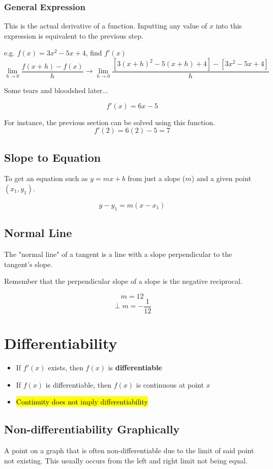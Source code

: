 \documentclass[a4paper,12pt]{article}
\begin{document}
\subsubsection{General Expression}
This is the actual derivative of a function. Inputting any value of $x$ into this expression is equivalent to the previous step.

e.g. $f(x) = 3x^2 - 5x + 4$, find $f'(x)$
$$\lim\limits_{h\to0}\frac{f(x+h)-f(x)}{h} \longrightarrow \lim\limits_{h\to0}\frac{[3(x+h)^2 - 5(x+h) + 4] - [3x^2 - 5x + 4]}{h}$$
\begin{center}Some tears and bloodshed later...\end{center}
$$f'(x) = 6x-5$$

For instance, the previous section can be solved using this function.
$$f'(2) = 6(2) - 5 = 7$$

\subsection{Slope to Equation}
To get an equation such as $y=mx+b$ from just a slope ($m$) and a given point $(x_1, y_1)$.

$$y - y_1 = m(x - x_1)$$

\subsection{Normal Line}
The "normal line" of a tangent is a line with a slope perpendicular to the tangent's slope.

Remember that the perpendicular slope of a slope is the negative reciprocal.

$$m = 12$$
$$\perp{m} = -\frac{1}{12}$$

\section{Differentiability}
\begin{itemize}
    \item{If $f'(x)$ exists, then $f(x)$ is \textbf{differentiable}}
    \item{If $f(x)$ is differentiable, then $f(x)$ is continuous at point $x$}
    \item{\hl{Continuity does not imply differentiability}}
\end{itemize}

\subsection{Non-differentiability Graphically}
A point on a graph that is often non-differentiable due to the limit of said point not existing. This usually occurs from the left and right limit not being equal.
\end{document}
